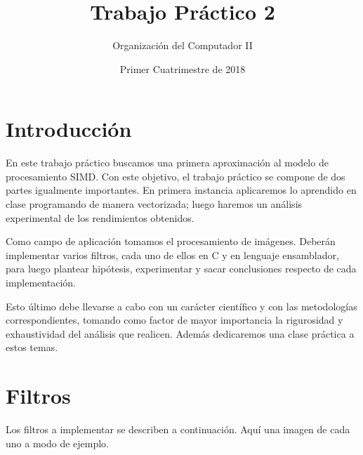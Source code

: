 \documentclass[a4paper, 12pt]{article}
\title{Trabajo Práctico 2}
\author{Organización del Computador II}
\date{Primer Cuatrimestre de 2018}
\begin{document}
\renewcommand{\labelenumi}{\alph{enumi}$)$}
\maketitle


\section{Introducción}

En este trabajo práctico buscamos una primera aproximación al modelo de procesamiento SIMD. Con este objetivo, el trabajo práctico se compone de dos partes igualmente importantes. En primera instancia aplicaremos lo aprendido en clase programando de manera vectorizada; luego haremos un análisis experimental de los rendimientos obtenidos.

Como campo de aplicación tomamos el procesamiento de imágenes. Deberán implementar varios filtros, cada uno de ellos en C y en lenguaje ensamblador, para luego plantear hipótesis, experimentar y sacar conclusiones respecto de cada implementación.

Esto último debe llevarse a cabo con un carácter científico y con las metodologías correspondientes, tomando como factor de mayor importancia
la rigurosidad y exhaustividad del análisis que realicen.
Además dedicaremos una clase práctica a estos temas.

\section{Filtros}
\label{filtros}
Los filtros a implementar se describen a continuación.
Aquí una imagen de cada uno a modo de ejemplo.
\end{document}
